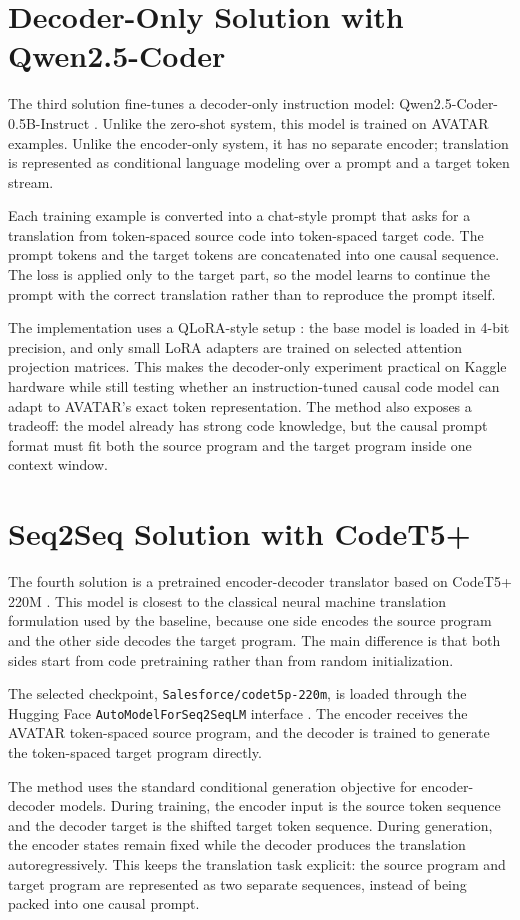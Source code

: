 \section{Decoder-Only Solution with Qwen2.5-Coder}

\quad The third solution fine-tunes a decoder-only instruction model:
Qwen2.5-Coder-0.5B-\allowbreak Instruct \cite{qwen2024qwen25coder05b}. Unlike the
zero-shot system, this model is trained on AVATAR examples. Unlike the
encoder-only system, it has no separate encoder; translation is represented as
conditional language modeling over a prompt and a target token stream.

Each training example is converted into a chat-style prompt that asks for a
translation from token-spaced source code into token-spaced target code. The
prompt tokens and the target tokens are concatenated into one causal sequence.
The loss is applied only to the target part, so the model learns to continue
the prompt with the correct translation rather than to reproduce the prompt
itself.

The implementation uses a QLoRA-style setup \cite{dettmers2023qlora}: the base
model is loaded in 4-bit precision, and only small LoRA adapters
\cite{hu2022lora} are trained on selected attention projection matrices. This
makes the decoder-only experiment practical on Kaggle hardware while still
testing whether an instruction-tuned causal code model can adapt to AVATAR's
exact token representation. The method also exposes a tradeoff: the model
already has strong code knowledge, but the causal prompt format must fit both
the source program and the target program inside one context window.

\section{Seq2Seq Solution with CodeT5+}

\quad The fourth solution is a pretrained encoder-decoder translator based on
CodeT5+ 220M \cite{wang2023codet5plus}. This model is closest to the classical
neural machine translation formulation used by the baseline, because one side
encodes the source program and the other side decodes the target program. The
main difference is that both sides start from code pretraining rather than from
random initialization.

The selected checkpoint, \texttt{Salesforce/codet5p-220m}, is loaded through
the Hugging Face \texttt{AutoModelForSeq2SeqLM} interface
\cite{wolf2020transformers}. The encoder receives the AVATAR token-spaced
source program, and the decoder is trained to generate the token-spaced target
program directly.

The method uses the standard conditional generation objective for
encoder-decoder models. During training, the encoder input is the source token
sequence and the decoder target is the shifted target token sequence. During
generation, the encoder states remain fixed while the decoder produces the
translation autoregressively. This keeps the translation task explicit: the
source program and target program are represented as two separate sequences,
instead of being packed into one causal prompt.
